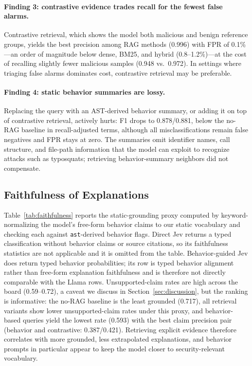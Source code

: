 \paragraph{Finding 3: contrastive evidence trades recall for the fewest
false alarms.} Contrastive retrieval, which shows the model both malicious
and benign reference groups, yields the best precision among RAG methods
(0.996) with FPR of 0.1\%---an order of magnitude below dense, BM25, and
hybrid (0.8--1.2\%)---at the cost of recalling slightly fewer malicious
samples (0.948 vs.\ 0.972). In settings where triaging false alarms
dominates cost, contrastive retrieval may be preferable.

\paragraph{Finding 4: static behavior summaries are lossy.} Replacing the
query with an AST-derived behavior summary, or adding it on top of
contrastive retrieval, actively hurts: F1 drops to 0.878/0.881, below the
no-RAG baseline in recall-adjusted terms, although all misclassifications
remain false negatives and FPR stays at zero. The summaries omit identifier
names, call structure, and file-path information that the model can exploit
to recognize attacks such as typosquats; retrieving behavior-summary
neighbors did not compensate.

\subsection{Faithfulness of Explanations}
\label{sec:faithfulness}

Table~\ref{tab:faithfulness} reports the static-grounding proxy computed by
keyword-normalizing the model's free-form behavior claims to our static
vocabulary and checking each against \texttt{ast}-derived behavior flags.
Direct Jev returns a typed classification without behavior claims or source
citations, so its faithfulness statistics are not applicable and it is
omitted from the table. Behavior-guided
Jev does return typed behavior probabilities; its row is typed behavior
alignment rather than free-form explanation faithfulness and is therefore not
directly comparable with the Llama rows.
Unsupported-claim rates are high across the board (0.59--0.72), a caveat we
discuss in Section~\ref{sec:discussion}, but the ranking is informative: the
no-RAG baseline is the least grounded (0.717), all retrieval variants show
lower unsupported-claim rates under this proxy, and behavior-based queries
yield the lowest rate (0.593)
with the best claim precision pair (behavior and contrastive: 0.387/0.421).
Retrieving explicit evidence therefore correlates with more grounded, less
extrapolated explanations, and behavior prompts in particular appear to keep
the model closer to security-relevant vocabulary.

